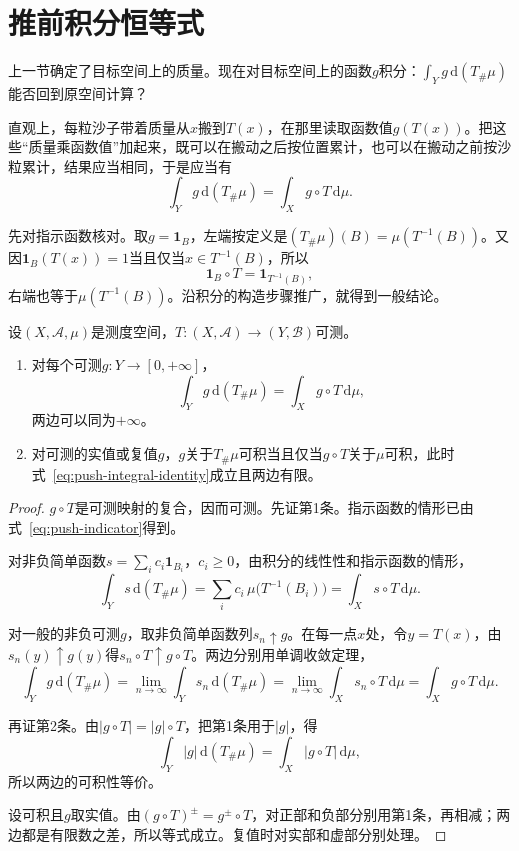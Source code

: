\section{推前积分恒等式}
\label{sec:push-integral-identity}

上一节确定了目标空间上的质量。现在对目标空间上的函数$g$积分：$\int_Yg\,\mathrm d(T_\#\mu)$能否回到原空间计算？

直观上，每粒沙子带着质量从$x$搬到$T(x)$，在那里读取函数值$g(T(x))$。把这些“质量乘函数值”加起来，既可以在搬动之后按位置累计，也可以在搬动之前按沙粒累计，结果应当相同，于是应当有
\[
\int_Yg\,\mathrm d(T_\#\mu)=\int_Xg\circ T\,\mathrm d\mu .
\]

先对指示函数核对。取$g=\mathbf 1_B$，左端按定义是$(T_\#\mu)(B)=\mu(T^{-1}(B))$。又因$\mathbf 1_B(T(x))=1$当且仅当$x\in T^{-1}(B)$，所以
\begin{equation}
\mathbf 1_B\circ T=\mathbf 1_{T^{-1}(B)},
\label{eq:push-indicator}
\end{equation}
右端也等于$\mu(T^{-1}(B))$。沿积分的构造步骤推广，就得到一般结论。

\begin{theorem}[推前积分恒等式]
\label{thm:push-integral-identity}
设$(X,\mathcal A,\mu)$是测度空间，$T:(X,\mathcal A)\to(Y,\mathcal B)$可测。
\begin{enumerate}
\item 对每个可测$g:Y\to[0,+\infty]$，
\begin{equation}
\int_Yg\,\mathrm d(T_\#\mu)=\int_Xg\circ T\,\mathrm d\mu ,
\label{eq:push-integral-identity}
\end{equation}
两边可以同为$+\infty$。
\item 对可测的实值或复值$g$，$g$关于$T_\#\mu$可积当且仅当$g\circ T$关于$\mu$可积，此时式~\eqref{eq:push-integral-identity}成立且两边有限。
\end{enumerate}
\end{theorem}

\begin{proof}
$g\circ T$是可测映射的复合，因而可测。先证第1条。指示函数的情形已由式~\eqref{eq:push-indicator}得到。

对非负简单函数$s=\sum_ic_i\mathbf 1_{B_i}$，$c_i\geq0$，由积分的线性性和指示函数的情形，
\[
\int_Ys\,\mathrm d(T_\#\mu)=\sum_ic_i\,\mu\bigl(T^{-1}(B_i)\bigr)=\int_Xs\circ T\,\mathrm d\mu .
\]

对一般的非负可测$g$，取非负简单函数列$s_n\uparrow g$。在每一点$x$处，令$y=T(x)$，由$s_n(y)\uparrow g(y)$得$s_n\circ T\uparrow g\circ T$。两边分别用单调收敛定理，
\[
\int_Yg\,\mathrm d(T_\#\mu)=\lim_{n\to\infty}\int_Ys_n\,\mathrm d(T_\#\mu)=\lim_{n\to\infty}\int_Xs_n\circ T\,\mathrm d\mu=\int_Xg\circ T\,\mathrm d\mu .
\]

再证第2条。由$\lvert g\circ T\rvert=\lvert g\rvert\circ T$，把第1条用于$\lvert g\rvert$，得
\[
\int_Y\lvert g\rvert\,\mathrm d(T_\#\mu)=\int_X\lvert g\circ T\rvert\,\mathrm d\mu ,
\]
所以两边的可积性等价。

设可积且$g$取实值。由$(g\circ T)^\pm=g^\pm\circ T$，对正部和负部分别用第1条，再相减；两边都是有限数之差，所以等式成立。复值时对实部和虚部分别处理。
\end{proof}

